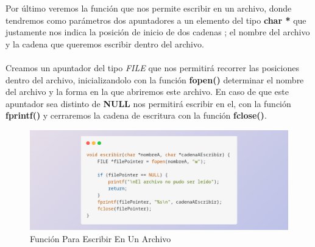 \documentclass[10pt]{article}
\begin{document}
	\newpage
	Por último veremos la función que nos permite escribir en un archivo, donde tendremos como parámetros dos apuntadores a un elemento del tipo \textbf{char *} que justamente nos indica la posición de inicio de dos cadenas ; el nombre del archivo y la cadena que queremos escribir dentro del archivo.
	\\\\
	Creamos un apuntador del tipo \textit{FILE} que nos permitirá recorrer las posiciones dentro del archivo, inicializandolo con la función \textbf{fopen()} determinar el nombre del archivo y la forma en la que abriremos este archivo. 
	En caso de que este apuntador sea distinto de \textbf{NULL} nos permitirá escribir en el, con la función \textbf{fprintf()} y cerraremos la cadena de escritura con la función \textbf{fclose()}.
	\begin{figure}[h!]
		\centering
		\includegraphics[width=\linewidth]{escritura.png}
		\caption{Función Para Escribir En Un Archivo}
		\label{fig:escritura}
	\end{figure}
	
\end{document}
